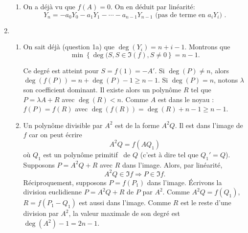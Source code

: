 \begin{enumerate}
\begin{enumerate}
\item On a déjà vu que $f(A)=0$. On en déduit par linéarité:
\begin{displaymath}
 Y_n = -a_0Y_0 - a_1Y_1 - \cdots - a_{n-1}Y_{n-1} \text{ (pas de terme en $a_iY_i$) }.
\end{displaymath}
\end{enumerate}

\item \begin{enumerate}
 \item On sait déjà (question 1a) que $\deg(Y_i) = n + i - 1$. Montrons que 
\[
  \min\left\lbrace \deg(S, S \in \Im(f), S \neq 0 \right\rbrace = n - 1. 
\]

Ce degré est atteint pour $S=f(1)= -A'$.\newline
Si $\deg(P) \neq n$, alors $\deg(f(P))= n+ \deg(P) -1 \geq n-1$.\newline
Si $\deg(P) = n$, notons $\lambda$ son coefficient dominant. Il existe alors un polynôme $R$ tel que $P=\lambda A +R$  avec $\deg(R)<n$.
Comme $A$ est dans le noyau : $f(P) = f(R)$ avec $\deg(f(R))=\deg(R)+n-1\geq n-1$.

\item Un polynôme divisible par $A^2$ est de la forme $A^2Q$. Il est dans l'image de $f$ car on peut écrire
\begin{displaymath}
 A^2Q = f(AQ_1)
\end{displaymath}
où $Q_1$ est un polynôme \og primitif\fg~ de $Q$ (c'est à dire tel que $Q_1'=Q$).\newline
Supposons $P=A^2Q+R$ avec $R$ dans l'image. Alors, par linéarité, 
\[
 A^2Q \in \Im f \Rightarrow P \in \Im f  .
\]
Réciproquement, supposons $P=f(P_1)$ dans l'image. \'Ecrivons la division euclidienne $P=A^2Q+R$ de $P$ par $A^2$. Comme $A^2Q=f(Q_1)$, $R=f(P_1-Q_1)$ est aussi dans l'image.\newline
Comme $R$ est le reste d'une division par $A^2$, la valeur maximale de son degré est $\deg(A^2)-1 = 2n -1$.
\end{enumerate}


\end{enumerate}
